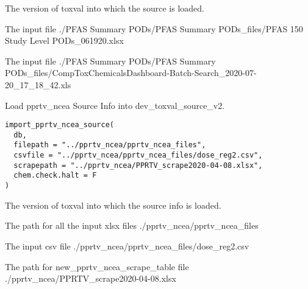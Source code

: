 \documentclass[letterpaper]{book}
\begin{document}
%
\begin{Arguments}
\begin{ldescription}
\item[\code{db}] The version of toxval into which the source is loaded.

\item[\code{infile1}] The input file ./PFAS Summary PODs/PFAS Summary PODs\_files/PFAS 150 Study Level PODs\_061920.xlsx

\item[\code{infile2}] The input file ./PFAS Summary PODs/PFAS Summary PODs\_files/CompToxChemicalsDashboard-Batch-Search\_2020-07-20\_17\_18\_42.xls
\end{ldescription}
\end{Arguments}
%
\begin{Description}\relax
Load pprtv\_ncea Source Info into dev\_toxval\_source\_v2.
\end{Description}
%
\begin{Usage}
\begin{verbatim}
import_pprtv_ncea_source(
  db,
  filepath = "../pprtv_ncea/pprtv_ncea_files",
  csvfile = "../pprtv_ncea/pprtv_ncea_files/dose_reg2.csv",
  scrapepath = "../pprtv_ncea/PPRTV_scrape2020-04-08.xlsx",
  chem.check.halt = F
)
\end{verbatim}
\end{Usage}
%
\begin{Arguments}
\begin{ldescription}
\item[\code{db}] The version of toxval into which the source info is loaded.

\item[\code{filepath}] The path for all the input xlsx files ./pprtv\_ncea/pprtv\_ncea\_files

\item[\code{csvfile}] The input csv file ./pprtv\_ncea/pprtv\_ncea\_files/dose\_reg2.csv

\item[\code{scrapepath}] The path for new\_pprtv\_ncea\_scrape\_table file ./pprtv\_ncea/PPRTV\_scrape2020-04-08.xlsx
\end{ldescription}
\end{Arguments}
\end{document}
